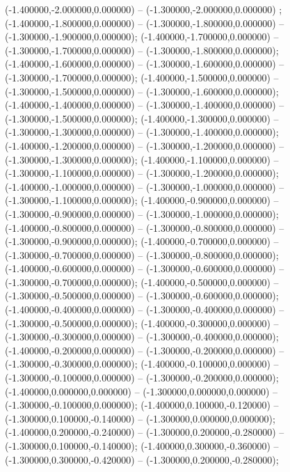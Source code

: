  (-1.400000,-2.000000,0.000000) -- (-1.300000,-2.000000,0.000000) ;
 (-1.400000,-1.800000,0.000000) -- (-1.300000,-1.800000,0.000000) -- (-1.300000,-1.900000,0.000000);
 (-1.400000,-1.700000,0.000000) -- (-1.300000,-1.700000,0.000000) -- (-1.300000,-1.800000,0.000000);
 (-1.400000,-1.600000,0.000000) -- (-1.300000,-1.600000,0.000000) -- (-1.300000,-1.700000,0.000000);
 (-1.400000,-1.500000,0.000000) -- (-1.300000,-1.500000,0.000000) -- (-1.300000,-1.600000,0.000000);
 (-1.400000,-1.400000,0.000000) -- (-1.300000,-1.400000,0.000000) -- (-1.300000,-1.500000,0.000000);
 (-1.400000,-1.300000,0.000000) -- (-1.300000,-1.300000,0.000000) -- (-1.300000,-1.400000,0.000000);
 (-1.400000,-1.200000,0.000000) -- (-1.300000,-1.200000,0.000000) -- (-1.300000,-1.300000,0.000000);
 (-1.400000,-1.100000,0.000000) -- (-1.300000,-1.100000,0.000000) -- (-1.300000,-1.200000,0.000000);
 (-1.400000,-1.000000,0.000000) -- (-1.300000,-1.000000,0.000000) -- (-1.300000,-1.100000,0.000000);
 (-1.400000,-0.900000,0.000000) -- (-1.300000,-0.900000,0.000000) -- (-1.300000,-1.000000,0.000000);
 (-1.400000,-0.800000,0.000000) -- (-1.300000,-0.800000,0.000000) -- (-1.300000,-0.900000,0.000000);
 (-1.400000,-0.700000,0.000000) -- (-1.300000,-0.700000,0.000000) -- (-1.300000,-0.800000,0.000000);
 (-1.400000,-0.600000,0.000000) -- (-1.300000,-0.600000,0.000000) -- (-1.300000,-0.700000,0.000000);
 (-1.400000,-0.500000,0.000000) -- (-1.300000,-0.500000,0.000000) -- (-1.300000,-0.600000,0.000000);
 (-1.400000,-0.400000,0.000000) -- (-1.300000,-0.400000,0.000000) -- (-1.300000,-0.500000,0.000000);
 (-1.400000,-0.300000,0.000000) -- (-1.300000,-0.300000,0.000000) -- (-1.300000,-0.400000,0.000000);
 (-1.400000,-0.200000,0.000000) -- (-1.300000,-0.200000,0.000000) -- (-1.300000,-0.300000,0.000000);
 (-1.400000,-0.100000,0.000000) -- (-1.300000,-0.100000,0.000000) -- (-1.300000,-0.200000,0.000000);
 (-1.400000,0.000000,0.000000) -- (-1.300000,0.000000,0.000000) -- (-1.300000,-0.100000,0.000000);
 (-1.400000,0.100000,-0.120000) -- (-1.300000,0.100000,-0.140000) -- (-1.300000,0.000000,0.000000);
 (-1.400000,0.200000,-0.240000) -- (-1.300000,0.200000,-0.280000) -- (-1.300000,0.100000,-0.140000);
 (-1.400000,0.300000,-0.360000) -- (-1.300000,0.300000,-0.420000) -- (-1.300000,0.200000,-0.280000);
